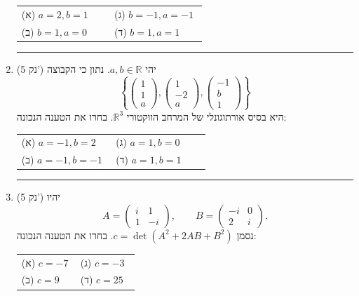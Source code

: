 \documentclass[12pt, a4paper]{article}
\newcommand{\points}[1]{(#1 נק') }
\begin{document}
\begin{enumerate}
\begin{tabular}{@{}p{0.48\linewidth} p{0.48\linewidth}@{}}
(א) $a=2,b=1$ & (ג) $b=-1,a=-1$\\
(ב) $b=1,a=0$ & (ד) $b=1,a=1$\\
\end{tabular}

\noindent\rule{\textwidth-30pt}{0.4pt}


\item\points{5}
יהי $a,b\in\mathbb{R}$. נתון כי הקבוצה
\[
\left\{
\begin{pmatrix}1\\[2pt]1\\[2pt]a\end{pmatrix},
\begin{pmatrix}1\\[2pt]-2\\[2pt]a\end{pmatrix},
\begin{pmatrix}-1\\[2pt]b\\[2pt]1\end{pmatrix}
\right\}
\]
היא בסיס אורתוגונלי של המרחב הווקטורי $\mathbb{R}^3$.
בחרו את הטענה הנכונה:

\begin{tabular}{@{}p{0.48\linewidth} p{0.48\linewidth}@{}}
(א) $a=-1,b=2$ & (ג) $a=1,b=0$\\
(ב) $a=-1,b=-1$ & (ד) $a=1,b=1$\\
\end{tabular}

\noindent\rule{\textwidth-30pt}{0.4pt}

\item\points{5}
יהיו
\[
A=
\begin{pmatrix}
i & 1\\
1 & -i
\end{pmatrix},
\qquad
B=
\begin{pmatrix}
-i & 0\\
2 & i
\end{pmatrix}.
\]
נסמן $c=\det(A^2+2AB+B^2)$. בחרו את הטענה הנכונה:

\begin{tabular}{@{}p{0.48\linewidth} p{0.48\linewidth}@{}}
(א) $c=-7$ & (ג) $c=-3$\\
(ב) $c=9$  & (ד) $c=25$\\
\end{tabular}





\end{enumerate}
\end{document}
